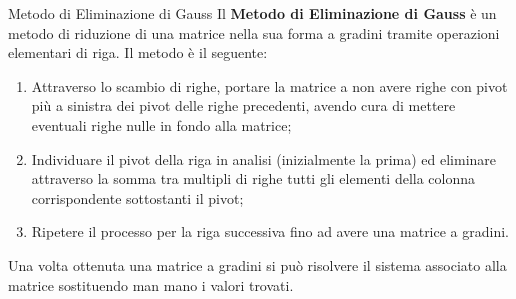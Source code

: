 \begin{teo}{Metodo di Eliminazione di Gauss}
    Il \textbf{Metodo di Eliminazione di Gauss} è un metodo di riduzione di una matrice nella sua forma a gradini tramite operazioni elementari di riga. Il metodo è il seguente:
    \begin{enumerate}
        \item Attraverso lo scambio di righe, portare la matrice a non avere righe con pivot più a sinistra dei pivot delle righe precedenti, avendo cura di mettere eventuali righe nulle in fondo alla matrice;
        \item Individuare il pivot della riga in analisi (inizialmente la prima) ed eliminare attraverso la somma tra multipli di righe tutti gli elementi della colonna corrispondente sottostanti il pivot;
        \item Ripetere il processo per la riga successiva fino ad avere una matrice a gradini.
    \end{enumerate}
\end{teo}
Una volta ottenuta una matrice a gradini si può risolvere il sistema associato alla matrice sostituendo man mano i valori trovati.
